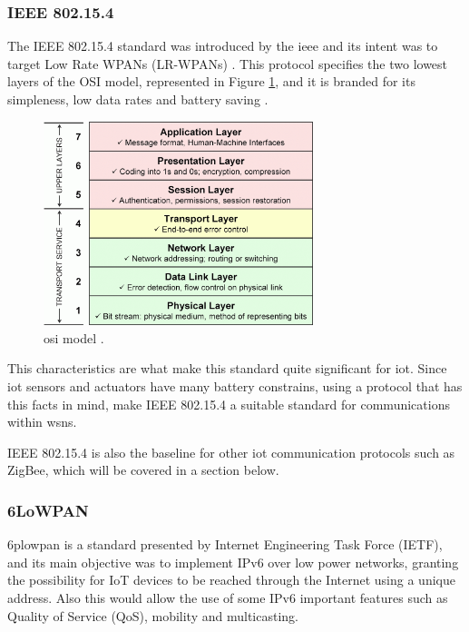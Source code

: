\subsubsection{IEEE 802.15.4}

The IEEE 802.15.4 standard was introduced by the \acf{ieee} and its intent was to target Low Rate WPANs (LR-WPANs) \cite{Kemp2010}. This protocol specifies the two lowest layers of the OSI model, represented in Figure \ref{fig:osi}, and it is branded for its simpleness, low data rates and battery saving \cite{Devadiga2003}.

\begin{figure}[H]
	\centering
	\includegraphics[width=0.7\textwidth]{figures/osi.png}
	\caption{\acf{osi} model \cite{Zikrillah}.}
	\label{fig:osi}
\end{figure}

This characteristics are what make this standard quite significant for \ac{iot}. Since \ac{iot} sensors and actuators have many battery constrains, using a protocol that has this facts in mind, make IEEE 802.15.4 a suitable standard for communications within \ac{wsn}s.

IEEE 802.15.4 is also the baseline for other \ac{iot} communication protocols such as ZigBee, which will be covered in a section below.


\subsubsection{6LoWPAN}
\acf{6plowpan} is a standard presented by Internet Engineering Task Force (IETF), and its main objective was to implement IPv6 over low power networks, granting the possibility for IoT devices to be reached through the Internet using a unique address. Also this would allow the use of some IPv6 important features such as Quality of Service (QoS), mobility and multicasting.

